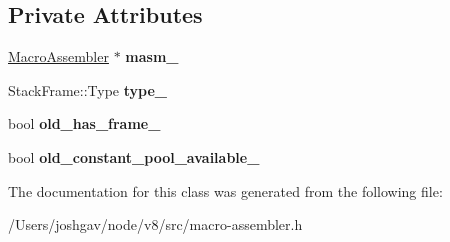 \subsection*{Private Attributes}
\begin{DoxyCompactItemize}
\item 
\hyperlink{classv8_1_1internal_1_1_macro_assembler}{Macro\+Assembler} $\ast$ {\bfseries masm\+\_\+}\hypertarget{classv8_1_1internal_1_1_frame_and_constant_pool_scope_afe14e899df50885f28ff5c03d3c8a831}{}\label{classv8_1_1internal_1_1_frame_and_constant_pool_scope_afe14e899df50885f28ff5c03d3c8a831}

\item 
Stack\+Frame\+::\+Type {\bfseries type\+\_\+}\hypertarget{classv8_1_1internal_1_1_frame_and_constant_pool_scope_a71670c711e56df784fc2c6fd67feb839}{}\label{classv8_1_1internal_1_1_frame_and_constant_pool_scope_a71670c711e56df784fc2c6fd67feb839}

\item 
bool {\bfseries old\+\_\+has\+\_\+frame\+\_\+}\hypertarget{classv8_1_1internal_1_1_frame_and_constant_pool_scope_a39650972fe8159d8bd5682b3096ece20}{}\label{classv8_1_1internal_1_1_frame_and_constant_pool_scope_a39650972fe8159d8bd5682b3096ece20}

\item 
bool {\bfseries old\+\_\+constant\+\_\+pool\+\_\+available\+\_\+}\hypertarget{classv8_1_1internal_1_1_frame_and_constant_pool_scope_a90452054eedb9dd0aa8f75256ea2838a}{}\label{classv8_1_1internal_1_1_frame_and_constant_pool_scope_a90452054eedb9dd0aa8f75256ea2838a}

\end{DoxyCompactItemize}


The documentation for this class was generated from the following file\+:\begin{DoxyCompactItemize}
\item 
/\+Users/joshgav/node/v8/src/macro-\/assembler.\+h\end{DoxyCompactItemize}
